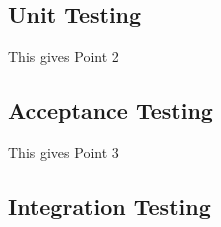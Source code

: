 \subsection{Unit Testing}
This gives Point 2

\subsection{Acceptance Testing}
This gives Point 3

\subsection{Integration Testing}